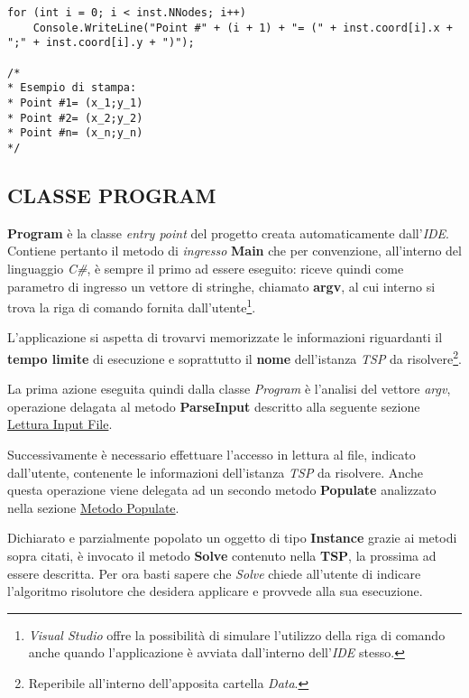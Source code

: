 \documentclass[11pt]{article}
\begin{document}
\begin{lstlisting}
for (int i = 0; i < inst.NNodes; i++)
    Console.WriteLine("Point #" + (i + 1) + "= (" + inst.coord[i].x + ";" + inst.coord[i].y + ")");
    
/*
* Esempio di stampa:
* Point #1= (x_1;y_1)
* Point #2= (x_2;y_2)
* Point #n= (x_n;y_n)
*/
\end{lstlisting}

\subsection*{CLASSE PROGRAM}
\label{sec:ClasseProgramS}

\textbf{Program} è la classe \textit{entry point} del progetto creata automaticamente dall'\textit{IDE}. Contiene pertanto il metodo di \textit{ingresso} \textbf{Main} che per convenzione, all'interno del linguaggio \textit{C\#}, è sempre il primo ad essere eseguito: riceve quindi come parametro di ingresso un vettore di stringhe, chiamato \textbf{argv}, al cui interno si trova la riga di comando fornita dall'utente\footnote{\textit{Visual Studio} offre la possibilità di simulare l'utilizzo della riga di comando anche quando l'applicazione è avviata dall'interno dell'\textit{IDE} stesso.}.

L'applicazione si aspetta  di trovarvi memorizzate le informazioni riguardanti il \textbf{tempo limite} di esecuzione e soprattutto il \textbf{nome} dell'istanza \textit{TSP} da risolvere\footnote{Reperibile all'interno dell'apposita cartella \textit{Data}.}.

La prima azione eseguita quindi dalla classe \textit{Program} è l'analisi del vettore \textit{argv}, operazione delagata al metodo \textbf{ParseInput} descritto alla seguente sezione \hyperref[sec:LetturaInputS]{Lettura Input File}.

Successivamente è necessario effettuare l'accesso in lettura al file, indicato dall'utente, contenente le informazioni dell'istanza \textit{TSP} da risolvere. Anche questa operazione viene delegata ad un secondo metodo \textbf{Populate} analizzato nella sezione \hyperref[sec:MetodoPopulateS]{Metodo Populate}.

Dichiarato e parzialmente popolato un oggetto di tipo \textbf{Instance} grazie ai metodi sopra citati, è invocato il metodo \textbf{Solve} contenuto nella \textbf{TSP}, la prossima ad essere descritta. Per ora basti sapere che \textit{Solve} chiede all'utente di indicare l'algoritmo risolutore che desidera applicare e provvede alla sua esecuzione.
\end{document}
